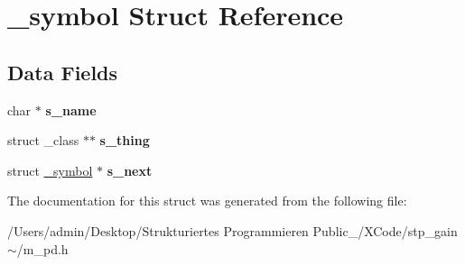 \hypertarget{struct__symbol}{}\section{\+\_\+symbol Struct Reference}
\label{struct__symbol}
\subsection*{Data Fields}
\begin{DoxyCompactItemize}
\item 
\mbox{\label{struct__symbol_a6c480a00c7475fce44b4175337e1bd6b}} 
char $\ast$ {\bfseries s\+\_\+name}
\item 
\mbox{\label{struct__symbol_a7595b2e847944a2233e371c38857275f}} 
struct \+\_\+class $\ast$$\ast$ {\bfseries s\+\_\+thing}
\item 
\mbox{\label{struct__symbol_ad222ee633bd80a4166b5c4a36212fa8e}} 
struct \hyperlink{struct__symbol}{\+\_\+symbol} $\ast$ {\bfseries s\+\_\+next}
\end{DoxyCompactItemize}


The documentation for this struct was generated from the following file\+:\begin{DoxyCompactItemize}
\item 
/\+Users/admin/\+Desktop/\+Strukturiertes Programmieren Public\+\_/\+X\+Code/stp\+\_\+gain$\sim$/m\+\_\+pd.\+h\end{DoxyCompactItemize}
